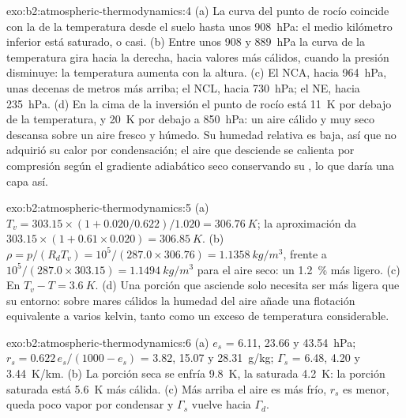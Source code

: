 \begin{solution}{exo:b2:atmospheric-thermodynamics:4}
(a) La curva del punto de rocío coincide con la de la temperatura desde el suelo hasta unos \qty{908}{hPa}:
el medio kilómetro inferior está saturado, o casi. (b) Entre unos 908 y \qty{889}{hPa}
la curva de la temperatura gira hacia la derecha, hacia valores más cálidos, cuando la presión disminuye: la
temperatura aumenta con la altura. (c) El NCA, hacia \qty{964}{hPa}, unas decenas de metros más arriba; el NCL, hacia
\qty{730}{hPa}; el NE, hacia \qty{235}{hPa}. (d) En la cima de la inversión el punto de rocío
está \qty{11}{K} por debajo de la temperatura, y \qty{20}{K} por debajo a \qty{850}{hPa}: un aire cálido y muy seco
descansa sobre un aire fresco y húmedo. Su humedad relativa es baja, así que no adquirió su
calor por condensación; el aire que desciende se calienta por compresión según el gradiente adiabático seco
conservando su , lo que daría una capa así.
\end{solution}

\begin{solution}{exo:b2:atmospheric-thermodynamics:5}
(a) $T_v = 303.15 \times (1 + 0.020/0.622)/1.020 = \qty{306.76}{K}$; la aproximación da
$303.15 \times (1 + 0.61 \times 0.020) = \qty{306.85}{K}$. (b) $\rho = p/(R_dT_v) = 10^5/(287.0
\times 306.76) = \qty{1.1358}{kg/m^3}$, frente a $10^5/(287.0 \times 303.15) =
\qty{1.1494}{kg/m^3}$ para el aire seco: un \qty{1.2}{\percent} más ligero. (c) En $T_v - T =
\qty{3.6}{K}$. (d) Una porción que asciende solo necesita ser más ligera que su entorno: sobre mares cálidos
la humedad del aire añade una flotación equivalente a varios kelvin, tanto como un exceso
de temperatura considerable.
\end{solution}

\begin{solution}{exo:b2:atmospheric-thermodynamics:6}
(a) $e_s$ = 6.11, 23.66 y \qty{43.54}{hPa}; $r_s = 0.622\,e_s/(1000 - e_s)$ = 3.82, 15.07 y
\qty{28.31}{g/kg}; $\Gamma_s$ = 6.48, 4.20 y \qty{3.44}{K/km}. (b) La porción seca se enfría
\qty{9.8}{K}, la saturada \qty{4.2}{K}: la porción saturada está \qty{5.6}{K} más cálida.
(c) Más arriba el aire es más frío, $r_s$ es menor, queda poco vapor por condensar y
$\Gamma_s$ vuelve hacia $\Gamma_d$.
\end{solution}

